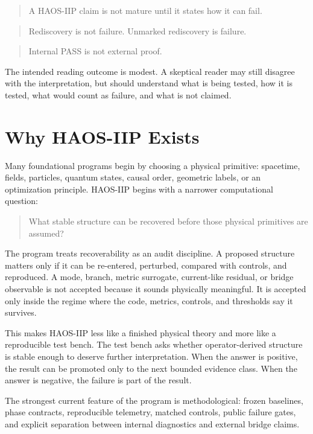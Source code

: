 \documentclass[11pt]{article}
\begin{document}
\begin{quote}
A HAOS-IIP claim is not mature until it states how it can fail.
\end{quote}

\begin{quote}
Rediscovery is not failure. Unmarked rediscovery is failure.
\end{quote}

\begin{quote}
Internal PASS is not external proof.
\end{quote}

The intended reading outcome is modest. A skeptical reader may still disagree with the interpretation, but should understand what is being tested, how it is tested, what would count as failure, and what is not claimed.

\section{Why HAOS-IIP Exists}

Many foundational programs begin by choosing a physical primitive: spacetime, fields, particles, quantum states, causal order, geometric labels, or an optimization principle. HAOS-IIP begins with a narrower computational question:

\begin{quote}
What stable structure can be recovered before those physical primitives are assumed?
\end{quote}

The program treats recoverability as an audit discipline. A proposed structure matters only if it can be re-entered, perturbed, compared with controls, and reproduced. A mode, branch, metric surrogate, current-like residual, or bridge observable is not accepted because it sounds physically meaningful. It is accepted only inside the regime where the code, metrics, controls, and thresholds say it survives.

This makes HAOS-IIP less like a finished physical theory and more like a reproducible test bench. The test bench asks whether operator-derived structure is stable enough to deserve further interpretation. When the answer is positive, the result can be promoted only to the next bounded evidence class. When the answer is negative, the failure is part of the result.

The strongest current feature of the program is methodological: frozen baselines, phase contracts, reproducible telemetry, matched controls, public failure gates, and explicit separation between internal diagnostics and external bridge claims.
\end{document}

